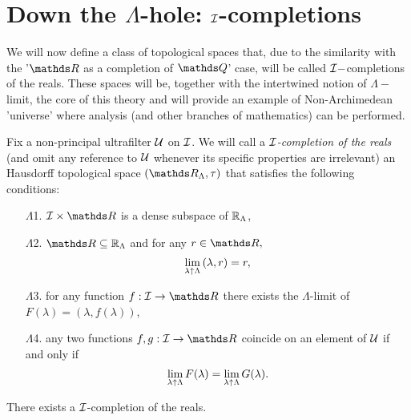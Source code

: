 \documentclass[draft.tex]{subfiles}
\begin{document}
\section{Down the $\Lambda$-hole: $\mathcal{I}$-completions}
We will now define a class of topological spaces that, due to the similarity with the '$\RR$ as a completion of $\QQ$' case, will be called $\mathcal{I}-$completions of the reals. These spaces will be, together with the intertwined notion of $\Lambda-$limit, the core of this theory and will provide an example of Non-Archimedean 'universe' where analysis (and other branches of mathematics) can be performed.
\begin{definition}
\label{def:completion}
Fix a non-principal ultrafilter $\mathcal{U}$ on $\mathcal{I}$. We will call a \emph{$\mathcal{I}$-completion of the reals} (and omit any reference to $\mathcal{U}$ whenever its specific properties are irrelevant) an Hausdorff topological space $(\RR_{\Lambda}, \tau)$ that satisfies the following conditions:
\begin{itemize}
    \item[$\Lambda$1.] $\cl{I} \times \RR$ is a dense subspace of $\mathbb{R}_{\Lambda}$,
    \item[$\Lambda$2.] $\RR \subseteq \completion$ and for any $r \in \RR,$
    \begin{equation*}
        \lim\limits_{\lambda \uparrow \Lambda}{(\lambda, r)} = r,
    \end{equation*}
    \item[$\Lambda$3.] for any function $f: \cl{I} \to \RR$ there exists the $\Lambda$-limit of $F(\lambda) = (\lambda, f(\lambda))$,
    \item[$\Lambda$4.] any two functions $f, g: \cl{I} \to \RR$ coincide on an element of $\mathcal{U}$ if and only if
    \begin{equation*}
        \lim\limits_{\lambda \uparrow \Lambda}{F(\lambda)} =  \lim\limits_{\lambda \uparrow \Lambda}{G(\lambda)}.
    \end{equation*}
\end{itemize}
\end{definition}
\begin{theorem}
\label{thm:existenceofcompl}
There exists a $\mathcal{I}$-completion of the reals.
\end{theorem}
\end{document}
